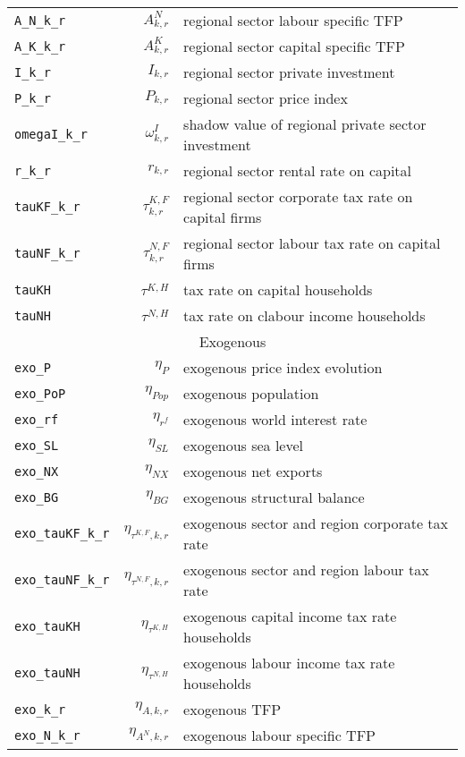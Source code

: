 \begin{center}
\begin{longtable}{lrl}
\texttt{A\_N\_k\_r} & ${A^{N}_{k,r}}$ & regional sector labour specific TFP\\
\texttt{A\_K\_k\_r} & ${A^{K}_{k,r}}$ & regional sector capital specific TFP\\
\texttt{I\_k\_r} & ${I_{k,r}}$ & regional sector private investment\\
\texttt{P\_k\_r} & ${P_{k,r}}$ & regional sector price index\\
\texttt{omegaI\_k\_r} & ${\omega^I_{k,r}}$ & shadow value of regional private sector investment\\
\texttt{r\_k\_r} & ${r_{k,r}}$ & regional sector rental rate on capital\\
\texttt{tauKF\_k\_r} & ${\tau^{K,F}_{k,r}}$ & regional sector corporate tax rate on capital firms\\
\texttt{tauNF\_k\_r} & ${\tau^{N,F}_{k,r}}$ & regional sector labour tax rate on capital firms\\
\texttt{tauKH} & ${\tau^{K,H}}$ & tax rate on capital households\\
\texttt{tauNH} & ${\tau^{N,H}}$ & tax rate on clabour income households\\
\hline
\multicolumn{3}{c}{Exogenous}\\%
\hline
\texttt{exo\_P} & ${\eta_{P}}$ & exogenous price index evolution\\
\texttt{exo\_PoP} & ${\eta_{Pop}}$ & exogenous population\\
\texttt{exo\_rf} & ${\eta_{r^f}}$ & exogenous world interest rate\\
\texttt{exo\_SL} & ${\eta_{SL}}$ & exogenous sea level\\
\texttt{exo\_NX} & ${\eta_{NX}}$ & exogenous net exports\\
\texttt{exo\_BG} & ${\eta_{BG}}$ & exogenous structural balance\\
\texttt{exo\_tauKF\_k\_r} & ${\eta_{\tau^{K,F},k,r}}$ & exogenous sector and region corporate tax rate\\
\texttt{exo\_tauNF\_k\_r} & ${\eta_{\tau^{N,F},k,r}}$ & exogenous sector and region labour tax rate\\
\texttt{exo\_tauKH} & ${\eta_{\tau^{K,H}}}$ & exogenous capital income tax rate households\\
\texttt{exo\_tauNH} & ${\eta_{\tau^{N,H}}}$ & exogenous labour income  tax rate households\\
\texttt{exo\_k\_r} & ${\eta_{A,k,r}}$ & exogenous TFP\\
\texttt{exo\_N\_k\_r} & ${\eta_{A^{N},k,r}}$ & exogenous labour specific TFP\\

\end{longtable}
\end{center}

